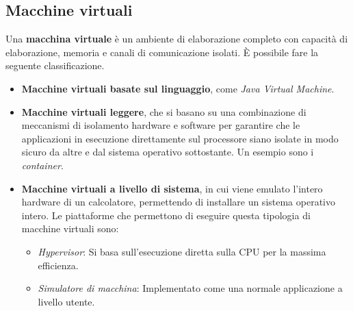 \subsection{Macchine virtuali}
Una \textbf{macchina virtuale} è un ambiente di elaborazione completo con capacità di elaborazione, memoria e canali di comunicazione isolati. \MakeUppercase{è} possibile fare la seguente classificazione.
\begin{itemize}
    \item \textbf{Macchine virtuali basate sul linguaggio}, come \textit{Java Virtual Machine}.
    \item \textbf{Macchine virtuali leggere}, che si basano su una combinazione di meccanismi di
    isolamento hardware e software per garantire che le applicazioni in esecuzione direttamente sul processore siano isolate in modo sicuro da altre e dal sistema operativo sottostante. Un esempio sono i \textit{container}.
    \item \textbf{Macchine virtuali a livello di sistema}, in cui viene emulato l'intero hardware di un calcolatore, permettendo di installare un sistema operativo intero. Le piattaforme che permettono di eseguire questa tipologia di macchine virtuali sono:
    \begin{itemize}
        \item \textit{Hypervisor}: Si basa sull'esecuzione diretta sulla CPU per la massima efficienza.
        \item \textit{Simulatore di macchina}: Implementato come una normale applicazione a livello utente.
    \end{itemize}
\end{itemize}


